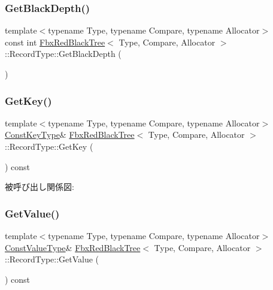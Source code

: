 \subsubsection{\texorpdfstring{Get\+Black\+Depth()}{GetBlackDepth()}}
{\footnotesize\ttfamily template$<$typename Type, typename Compare, typename Allocator$>$ \\
const int \hyperlink{class_fbx_red_black_tree}{Fbx\+Red\+Black\+Tree}$<$ Type, Compare, Allocator $>$\+::Record\+Type\+::\+Get\+Black\+Depth (\begin{DoxyParamCaption}{ }\end{DoxyParamCaption})}

\mbox{\label{class_fbx_red_black_tree_1_1_record_type_a3844e4735fb81e224eb8c24cedc761c5}} 
\subsubsection{\texorpdfstring{Get\+Key()}{GetKey()}}
{\footnotesize\ttfamily template$<$typename Type, typename Compare, typename Allocator$>$ \\
\hyperlink{class_fbx_red_black_tree_ad0aa82c0fd952b04edb550fc1fb36a32}{Const\+Key\+Type}\& \hyperlink{class_fbx_red_black_tree}{Fbx\+Red\+Black\+Tree}$<$ Type, Compare, Allocator $>$\+::Record\+Type\+::\+Get\+Key (\begin{DoxyParamCaption}{ }\end{DoxyParamCaption}) const}

被呼び出し関係図\+:
\mbox{\label{class_fbx_red_black_tree_1_1_record_type_a300348e40e4648c7371d20c398862bec}} 
\subsubsection{\texorpdfstring{Get\+Value()}{GetValue()}\hspace{0.1cm}{\footnotesize\ttfamily [1/2]}}
{\footnotesize\ttfamily template$<$typename Type, typename Compare, typename Allocator$>$ \\
\hyperlink{class_fbx_red_black_tree_a60ce913af196ee4cf886585363c4b0ca}{Const\+Value\+Type}\& \hyperlink{class_fbx_red_black_tree}{Fbx\+Red\+Black\+Tree}$<$ Type, Compare, Allocator $>$\+::Record\+Type\+::\+Get\+Value (\begin{DoxyParamCaption}{ }\end{DoxyParamCaption}) const}

